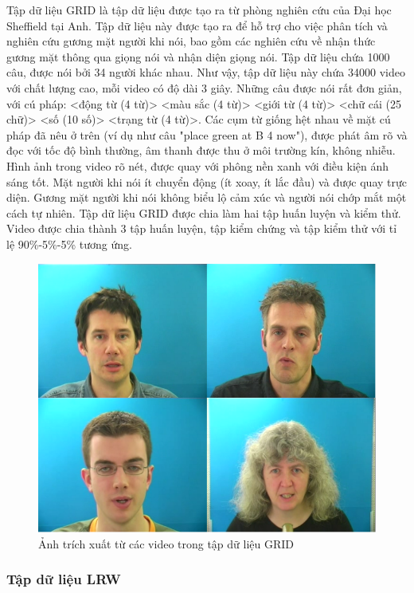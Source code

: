 Tập dữ liệu GRID là tập dữ liệu được tạo ra từ phòng nghiên cứu của Đại học Sheffield tại Anh. Tập dữ liệu này được tạo ra để hỗ trợ cho việc phân tích và nghiên cứu gương mặt người khi nói, bao gồm các nghiên cứu về nhận thức gương mặt thông qua giọng nói và nhận diện giọng nói. Tập dữ liệu chứa 1000 câu, được nói bởi 34 người khác nhau. Như vậy, tập dữ liệu này chứa 34000 video với chất lượng cao, mỗi video có độ dài 3 giây. Những câu được nói rất đơn giản, với cú pháp: <động từ (4 từ)> <màu sắc (4 từ)> <giới từ (4 từ)> <chữ cái (25 chữ)> <số (10 số)> <trạng từ (4 từ)>. Các cụm từ giống hệt nhau về mặt cú pháp đã nêu ở trên (ví dụ như câu "place green at B 4 now"), được phát âm rõ và đọc với tốc độ bình thường, âm thanh được thu ở môi trường kín, không nhiễu. Hình ảnh trong video rõ nét, được quay với phông nền xanh với điều kiện ánh sáng tốt. Mặt người khi nói ít chuyển động (ít xoay, ít lắc đầu) và được quay trực diện. Gương mặt người khi nói không biểu lộ cảm xúc và người nói chớp mắt một cách tự nhiên. Tập dữ liệu GRID được chia làm hai tập huấn luyện và kiểm thử. Video được chia thành 3 tập huấn luyện, tập kiểm chứng và tập kiểm thử với tỉ lệ 90\%-5\%-5\% tương ứng.

\begin{figure}[H]
    \centering
    \includegraphics[width=12cm]{./content/materials/grid.png}
    \caption{Ảnh trích xuất từ các video trong tập dữ liệu GRID}
\end{figure}

\subsubsection{Tập dữ liệu LRW \cite{lrw}}

